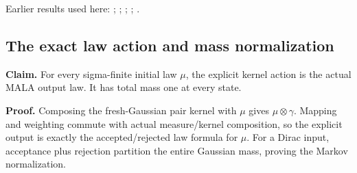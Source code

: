 \documentclass[11pt,a4paper]{report}
\begin{document}
Earlier results used here: \cite[Section~3.34.1]{LangevinLean2026ULASC}; \cite[Section~3.36.2]{LangevinLean2026ULASC}; \cite[Section~3.36.5]{LangevinLean2026ULASC}; \cite[Section~3.36.6]{LangevinLean2026ULASC}; \cite[Section~3.36.8]{LangevinLean2026ULASC}.
\subsection{\texorpdfstring{The exact law action and mass normalization}{The exact law action and mass normalization}}
\label{report-step-WassersteinMixing-SemigroupMALAKernel-lean-2}


\textbf{Claim.} For every sigma-finite initial law \(\mu\), the explicit kernel action is the actual MALA output law. It has total mass one at every state.



\textbf{Proof.} Composing the fresh-Gaussian pair kernel with \(\mu\) gives \(\mu\otimes\gamma\). Mapping and weighting commute with actual measure/\allowbreak{}kernel composition, so the explicit output is exactly the accepted/\allowbreak{}rejected law formula for \(\mu\). For a Dirac input, acceptance plus rejection partition the entire Gaussian mass, proving the Markov normalization.
\end{document}
